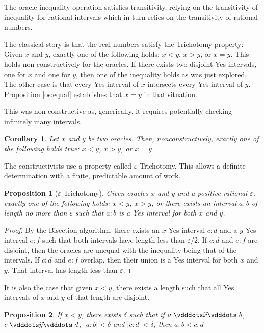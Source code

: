 \documentclass[12pt]{article}
\newtheorem{corollary}{Corollary}[section]
\newtheorem{proposition}{Proposition}[section]
\begin{document}
The oracle inequality operation satisfies transitivity, relying on the transitivity of inequality for rational intervals which in turn relies on the transitivity of rational numbers. 

The classical story is that the real numbers satisfy the Trichotomy property: Given $x$ and $y$, exactly one of the following holds: $x<y$, $x>y$, or $x=y$. This holds non-constructively for the oracles. If there exists two disjoint Yes intervals, one for $x$ and one for $y$, then one of the inequality holds as was just explored. The other case is that every Yes interval of $x$ intersects every Yes interval of $y$. Proposition \ref{os:equal} establishes that $x=y$ in that situation. 
 

This was non-constructive as, generically, it requires potentially checking infinitely many intervals. 

\begin{corollary}
    Let $x$ and $y$ be two oracles. Then, nonconstructively, exactly one of the following holds true: $x<y$, $x>y$, or $x=y$.
\end{corollary}

The constructivists use a property called $\varepsilon$-Trichotomy. This allows a definite determination with a finite, predictable amount of work. 

\begin{proposition}[$\varepsilon$-Trichotomy]
    Given oracles $x$ and $y$ and a positive rational $\varepsilon$, exactly one of the following holds: $x<y$, $x>y$, or there exists an interval $a:b$ of length no more than $\varepsilon$ such that $a:b$ is a Yes interval for both $x$ and $y$.
\end{proposition}

\begin{proof}
    By the Bisection algorithm, there exists an $x$-Yes interval $c:d$ and a $y$-Yes interval $e:f$ such that both intervals have length less than $\varepsilon/2$. If $c:d$ and $e:f$ are disjoint, then the oracles are unequal with the inequality being that of the intervals. If $c:d$ and $e:f$ overlap, then their union is a Yes interval for both $x$ and $y$. That interval has length less than $\varepsilon$.
\end{proof}

It is also the case that given $x < y$, there exists a length such that all Yes intervals of $x$ and $y$ of that length are disjoint. 

\begin{proposition}
    If $ x< y$, there exists $\delta$ such that if $a \xora b$, $c \xora[y] d$, $|a:b| < \delta$ and $|c:d| < \delta$, then $a:b < c:d$
\end{proposition}
\end{document}
